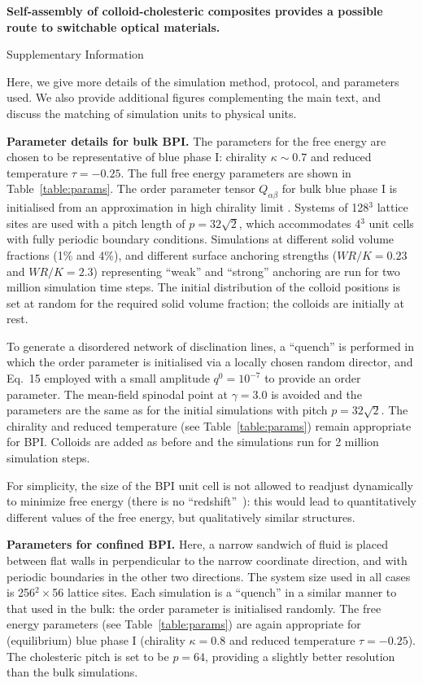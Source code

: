 \documentclass[12pt,twoside]{article}
\begin{document}
{\bf
Self-assembly of colloid-cholesteric
composites provides a possible route to switchable optical materials.

Supplementary Information}

Here, we give more details of the simulation method, protocol, and parameters used. We also provide additional figures complementing the main text, and discuss the matching of simulation units to physical units. 

\noindent
\textbf{Parameter details for bulk BPI.}
The parameters for the free energy are chosen to be representative
of blue phase I: chirality $\kappa \sim 0.7$ and reduced temperature
$\tau = -0.25$.
The full free energy parameters are shown in Table~\ref{table:params}.
The order parameter tensor $Q_{\alpha\beta}$ for bulk blue phase I is
initialised from an approximation in high chirality limit
\cite{blue1,oliver1}. Systems of 128$^3$ lattice sites are
used with a pitch length of $p = 32\sqrt{2}$, which accommodates 4$^3$
unit cells with fully periodic boundary conditions.
Simulations at different solid volume fractions (1\% and 4\%), and different 
surface anchoring strengths ($WR/K = 0.23$ and $WR/K = 2.3$) representing
``weak'' and ``strong'' anchoring are run for two million simulation
time steps.
The initial distribution of the colloid positions is set at random
for the required solid volume fraction; the colloids are initially
at rest.

To generate a disordered network of disclination lines, a ``quench''
is performed in which the order parameter is initialised via a
locally chosen random director, and
Eq.~15
employed with a small amplitude $q^0 = 10^{-7}$ to
provide an order parameter.
The mean-field spinodal point at $\gamma = 3.0$ is avoided and
the parameters are the same as for the initial simulations with
pitch $p = 32\sqrt{2}$. The chirality and reduced temperature (see
Table~\ref{table:params}) remain appropriate for BPI.
Colloids are added as before and the simulations run for 2 million
simulation steps.

For simplicity,  the size of the BPI unit cell is not allowed to 
readjust dynamically to minimize free energy (there is no 
``redshift''~\cite{blue1}): this would lead to quantitatively different 
values of the free energy, but qualitatively similar structures. 

\noindent
\textbf{Parameters for confined BPI.}
Here, a narrow sandwich of fluid is placed between flat walls in
perpendicular to the narrow coordinate direction, and with periodic
boundaries in the other two directions. The system size used in all
cases is 256$^2 \times$56 lattice sites. Each simulation is a ``quench''
in a similar manner to that used in the bulk: the order parameter is
initialised randomly. The free energy parameters (see Table~\ref{table:params})
are again appropriate for (equilibrium) blue phase I
(chirality $\kappa = 0.8$ and
reduced temperature $\tau = -0.25$). The cholesteric pitch is set
to be $p = 64$, providing a slightly better resolution than the bulk
simulations.
\end{document}
